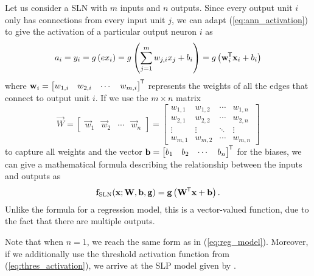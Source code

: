 Let us consider a SLN with $m$ inputs and $n$ outputs. 
Since every output unit $i$ only has connections from every input unit $j$,
we can adapt (\ref{eq:ann_activation}) to give the activation of a particular output neuron $i$ as
\begin{equation}
    a_i = y_i = g\left({ex}_i\right) = g\left(\sum_{j=1}^m{w_{j,i} x_j} + b_i\right)
    = g\left( \mathbf{w}_i^{\mkern-1.5mu\mathsf{T}} \mathbf{x}_i + b_i\right)
\end{equation}
where
$
    \mathbf{w}_i = \begin{bmatrix}
        w_{1,i} & w_{2,i} & \cdots & w_{m,i}
    \end{bmatrix}^{\mkern-1.5mu\mathsf{T}}
$
represents the weights of all the edges that connect to output unit $i$.
If we use the $m \times n$ matrix
\begin{equation}
    \vec{W} = \begin{bmatrix}
        \vec{w}_1 & \vec{w}_2 & \cdots & \vec{w}_n
    \end{bmatrix} = \begin{bmatrix}
        w_{1,1} & w_{1,2} & \cdots & w_{1,n} \\
        w_{2,1} & w_{2,2} & \cdots & w_{2,n} \\
        \vdots & \vdots & \ddots & \vdots \\
        w_{m,1} & w_{m,2} & \cdots & w_{m,n}
    \end{bmatrix}
\end{equation}
to capture all weights and the vector $\mathbf{b} = \begin{bmatrix}
    b_1 & b_2 & \cdots & b_n
\end{bmatrix}^{\mkern-1.5mu\mathsf{T}}$ for the biases, we can give a mathematical formula describing the relationship between the inputs and outputs as
\begin{equation}
    \label{eq:single_layer_perceptron}
    \mathbf{f_{\text{SLN}}}(\mathbf{x}; \mathbf{W}, \mathbf{b}, \mathbf{g}) = \mathbf{g}\left( \mathbf{W}^{\mkern-1.5mu\mathsf{T}} \mathbf{x} + \mathbf{b} \right).
\end{equation}
Unlike the formula for a regression model, this is a vector-valued function, due to the fact that there are multiple outputs. 

Note that when $n=1$, we reach the same form as in (\ref{eq:reg_model}). 
Moreover, if we additionally use the threshold activation function from (\ref{eq:thres_activation}), we arrive at the SLP model given by \citet{rosenblatt1958}.

